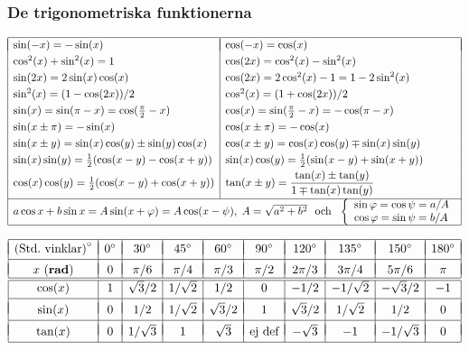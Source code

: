 \documentclass{article}
\begin{document}
\subsubsection*{De trigonometriska funktionerna}%

$\begin{array}{|l|l|}\hline &\\*[-11pt] %
 \sin(-x)=-\sin(x) &\cos(-x)=\cos(x) \EndRow
 \cos^2(x)+\sin^2(x)=1  &
 \cos(2x)=\cos^2(x)-\sin^2(x) \EndRow %
 \sin(2x)=2\sin(x)\cos(x)&\cos(2x)=2\cos^2(x)-1=1-2\sin^2(x) \EndRow
 \sin^2(x) = (1-\cos(2x))/2 &
 \cos^2(x) = (1+\cos(2x))/2 \EndRow %
 \sin(x)=\sin(\pi-x)=\cos(\frac{\pi}{2}-x) &
 \cos(x)=\sin(\frac{\pi}{2}-x)=-\cos(\pi-x)\EndRow 
 \sin(x\pm\pi) = -\sin(x) &
 \cos(x\pm\pi) = -\cos(x) \EndRow %
 \sin(x\pm y)=\sin(x)\cos(y)\pm\sin(y)\cos(x) &
 \cos(x\pm y)=\cos(x)\cos(y)\mp\sin(x)\sin(y)\EndRow 
 \sin(x)\sin(y)=\frac{1}{2}(\cos(x-y)-\cos(x+y)) &
 \sin(x)\cos(y)=\frac{1}{2}(\sin(x-y)+\sin(x+y)) \EndRow
 \cos(x)\cos(y)=\frac{1}{2}(\cos(x-y)+\cos(x+y)) &
 \tan(x\pm y)=\dfrac{\tan(x)\pm\tan(y)}{1\mp\tan(x)\tan(y)}\\*[8pt]
 \cline{1-2}\multicolumn{2}{|c|}{     %
   a\cos x+b\sin x=A\sin(x+\varphi) = A\cos(x-\psi),\;
              A=\sqrt{a^2+b^2}  
     \mbox{ \ och \ }
              \left\{ \begin{array}{l}
              \sin\varphi=\cos\psi=a/A \\
              \cos\varphi=\sin\psi=b/A
\end{array}\right.}
 \EndRow\hline\end{array}$ %

\vspace{1 mm}

{%
\let\F\frac
\newcommand\CC[1]{#1^\circ}
\def\myEnd{\\*[2pt]\hline &&&&&&&&& \\*[-9pt]}
\def\myEnd{\\*[2pt]\hline &&&&&&&&& \\*[-9pt]}
\newcommand\tW{{\sqrt2}}
\newcommand\tH{{\sqrt3}}
$
\begin{array}{|c|c|c|c|c|c|c|c|c|c|}
\hline & & & & & & & & &\\*[-10pt]
\mbox{(Std.~vinklar)}^\circ
  & \CC{0} &\CC{30} &\CC{45} &\CC{60} &\CC{90} &\CC{120} &\CC{135} &\CC{150} &\CC{180}
 \myEnd
 x \mbox{ (\textbf{rad})} 
        & 0     & \pi/6 & \pi/4 &  \pi/3 & \pi/2 & 2\pi/3 & 3\pi/4 & 5\pi/6 &\pi 
 \\\hline\hline
 \cos(x)&   1   & \tH/2 & 1/\tW &  1/2  &   0   & -1/2   & -1/\tW & -\tH/2 & -1 
 \myEnd 
 \sin(x)&   0   &   1/2 & 1/\tW & \tH/2 &   1   & \tH/2  &  1/\tW &   1/2  &  0 
 \myEnd 
 \tan(x)&   0   & 1/\tH &   1   & \tH   &
                                    \mbox{ej def}
                                                &-\tH  &    -1  & -1/\tH &  0 
 \\*[2pt]\hline
\end{array}
$
}%
\end{document}
